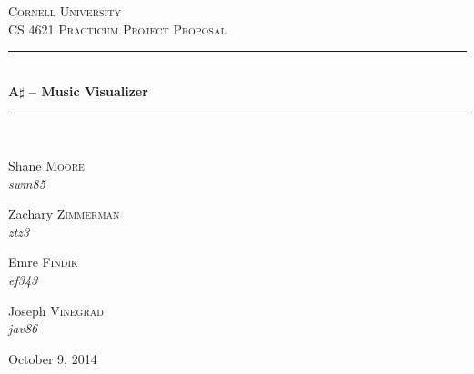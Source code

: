 \documentclass{article}
\newcommand{\HRule}{\rule{\linewidth}{0.5mm}}
\begin{document}
\begin{titlepage}
\begin{center}

\textsc{\LARGE Cornell University}\\[1.5cm]

\textsc{\Large CS 4621 Practicum Project Proposal}\\[0.5cm]

\HRule \\[0.4cm]
{ \huge \bfseries A$\sharp$ -- Music Visualizer \\[0.4cm] }

\HRule \\[1.5cm]

\begin{minipage}{0.4\textwidth}
\begin{flushleft} \large
Shane \textsc{Moore} \\
\emph{swm85}
\end{flushleft}
\end{minipage}
\begin{minipage}{0.4\textwidth}
\begin{flushright} \large
Zachary \textsc{Zimmerman} \\
\emph{ztz3}
\end{flushright}
\end{minipage}
\par\vspace{0.5cm}
\begin{minipage}{0.4\textwidth}
\begin{flushleft} \large
Emre \textsc{Findik} \\
\emph{ef343}
\end{flushleft}
\end{minipage}
\begin{minipage}{0.4\textwidth}
\begin{flushright} \large
Joseph \textsc{Vinegrad} \\
\emph{jav86}
\end{flushright}
\end{minipage}

\vfill

{\large October 9, 2014}

\end{center}

\end{titlepage}

\end{document}
